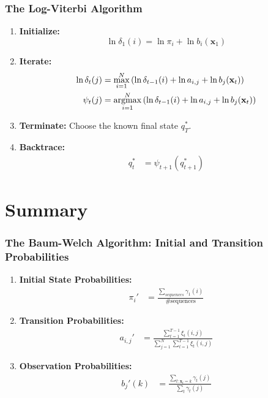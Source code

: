 \documentclass{beamer}
\newcommand{\argmax}{\operatornamewithlimits{argmax}}
\begin{document}
\begin{frame}
  \frametitle{The Log-Viterbi Algorithm}

  \begin{enumerate}
  \item {\bf Initialize:}
    \[
    \ln\delta_1(i) = \ln\pi_i +\ln b_i(\mathbf{x}_1)
    \]
  \item {\bf Iterate:}
    \begin{align*}
      \ln\delta_{t}(j) &= \max_{i=1}^N \left(\ln\delta_{t-1}(i) +\ln a_{i,j}+ \ln b_j(\mathbf{x}_t)\right)\\
      \psi_{t}(j) &= \argmax_{i=1}^N \left(\ln\delta_{t-1}(i) +\ln a_{i,j}+ \ln b_j(\mathbf{x}_t)\right)
    \end{align*}
  \item {\bf Terminate:}
    Choose the known final state $q_T^*$.
  \item {\bf Backtrace:}
    \begin{align*}
      q_t^* &= \psi_{t+1}\left(q_{t+1}^*\right)
    \end{align*}
  \end{enumerate}
\end{frame}

\section[Summary]{Summary}
\setcounter{subsection}{1}

\begin{frame}
  \frametitle{The Baum-Welch Algorithm: Initial and Transition Probabilities}

  \begin{enumerate}
  \item {\bf Initial State Probabilities:}
    \begin{align*}
      \pi_i' &=\frac{\sum_{sequences} \gamma_1(i)}{\mbox{\# sequences}}
    \end{align*}
  \item {\bf Transition Probabilities:}
    \begin{align*}
      a_{i,j}' &=\frac{\sum_{t=1}^{T-1} \xi_t(i,j)}{\sum_{j=1}^N\sum_{t=1}^{T-1}\xi_t(i,j)}
    \end{align*}
  \item {\bf Observation Probabilities:}
    \begin{align*}
      b_{j}'(k) &=\frac{\sum_{t:\mathbf{x}_t=k} \gamma_t(j)}{\sum_{t}\gamma_t(j)}
    \end{align*}
  \end{enumerate}
\end{frame}
\end{document}
